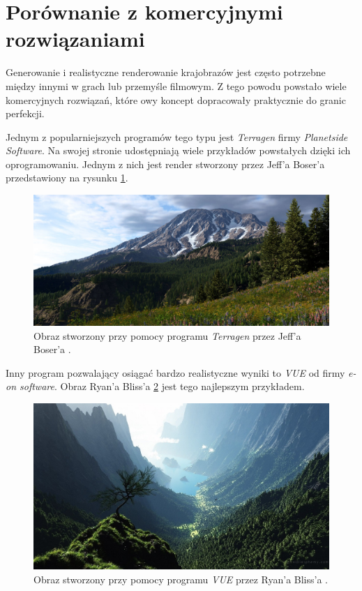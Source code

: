 \documentclass[inz,shortabstract]{iithesis}
\begin{document}
    \section{Porównanie z komercyjnymi rozwiązaniami}
        Generowanie i realistyczne renderowanie krajobrazów jest często potrzebne między innymi w grach lub przemyśle filmowym. Z tego powodu powstało wiele komercyjnych rozwiązań, które owy koncept dopracowały praktycznie do granic perfekcji. 
        
        Jednym z popularniejszych programów tego typu jest \textit{Terragen} firmy \textit{Planetside Software}. Na swojej stronie udostępniają wiele przykładów powstałych dzięki ich oprogramowaniu. Jednym z nich jest render stworzony przez Jeff'a Boser'a przedstawiony na rysunku \ref{fig:terragen}. 
        \begin{figure}[H] 
            \includegraphics[width=\linewidth]{terragen.png}
            \caption{Obraz stworzony przy pomocy programu \textit{Terragen} przez Jeff'a Boser'a \cite{terragen}.} 
            \label{fig:terragen}
        \end{figure}
        
        Inny program pozwalający osiągać bardzo realistyczne wyniki to \textit{VUE} od firmy \textit{e-on software}. Obraz Ryan'a Bliss'a \ref{fig:vue} jest tego najlepszym przykładem.
        \begin{figure}[H] 
            \includegraphics[width=\linewidth]{vue.png}
            \caption{Obraz stworzony przy pomocy programu \textit{VUE} przez Ryan'a Bliss'a \cite{vue}.} 
            \label{fig:vue}
        \end{figure}
        
\end{document}
